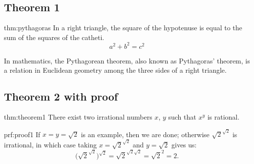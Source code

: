 \subsection{Theorem 1}

\begin{theo}{thm:pythagoras}
	In a right triangle, the square of the hypotenuse is equal to the sum of the squares of the catheti.
	\[a^2+b^2=c^2\]
\end{theo}
In mathematics, the Pythagorean theorem, also known as Pythagoras' theorem, is a relation in Euclidean geometry among the three sides of a right triangle.


\subsection{Theorem 2 with proof}
\begin{theo}{thm:theorem1}
	There exist two irrational numbers $x$, $y$ such that $x^y$ is rational.
\end{theo}
 
\begin{prf}{prf:proof1}
	If $x=y=\sqrt{2}$ is an example, then we are done; otherwise $\sqrt{2}^{\sqrt{2}}$ is irrational, in which case taking $x=\sqrt{2}^{\sqrt{2}}$ and $y=\sqrt{2}$ gives us:
	\[\bigg(\sqrt{2}^{\sqrt{2}}\bigg)^{\sqrt{2}}=\sqrt{2}^{\sqrt{2}\sqrt{2}}=\sqrt{2}^{2}=2.\]
\end{prf}
